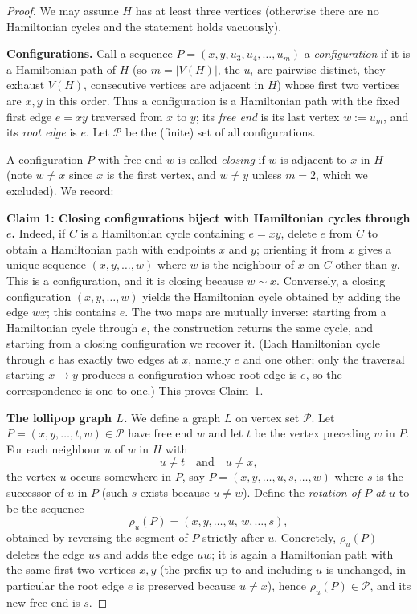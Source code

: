 \documentclass{amsart}
\theoremstyle{plain}
\theoremstyle{definition}
\begin{document}
\begin{proof}
We may assume $H$ has at least three vertices (otherwise there are no
Hamiltonian cycles and the statement holds vacuously).

\medskip
\noindent\textbf{Configurations.}
Call a sequence $P=(x,y,u_3,u_4,\dots,u_m)$ a \emph{configuration} if it is a
Hamiltonian path of $H$ (so $m=|V(H)|$, the $u_i$ are pairwise distinct, they
exhaust $V(H)$, consecutive vertices are adjacent in $H$) whose first two
vertices are $x,y$ in this order.  Thus a configuration is a Hamiltonian path
with the fixed first edge $e=xy$ traversed from $x$ to $y$; its \emph{free end}
is its last vertex $w:=u_m$, and its \emph{root edge} is $e$.  Let $\mathcal P$
be the (finite) set of all configurations.

A configuration $P$ with free end $w$ is called \emph{closing} if $w$ is adjacent
to $x$ in $H$ (note $w\neq x$ since $x$ is the first vertex, and $w\neq y$ unless
$m=2$, which we excluded).  We record:

\medskip
\noindent\textbf{Claim 1: Closing configurations biject with Hamiltonian cycles
through $e$.}
Indeed, if $C$ is a Hamiltonian cycle containing $e=xy$, delete $e$ from $C$ to
obtain a Hamiltonian path with endpoints $x$ and $y$; orienting it from $x$
gives a unique sequence $(x,y,\dots,w)$ where $w$ is the neighbour of $x$ on $C$
other than $y$.  This is a configuration, and it is closing because $w\sim x$.
Conversely, a closing configuration $(x,y,\dots,w)$ yields the Hamiltonian cycle
obtained by adding the edge $wx$; this contains $e$.  The two maps are mutually
inverse: starting from a Hamiltonian cycle through $e$, the construction returns
the same cycle, and starting from a closing configuration we recover it.  (Each
Hamiltonian cycle through $e$ has exactly two edges at $x$, namely $e$ and one
other; only the traversal starting $x\to y$ produces a configuration whose root
edge is $e$, so the correspondence is one-to-one.)  This proves Claim~1.

\medskip
\noindent\textbf{The lollipop graph $L$.}
We define a graph $L$ on vertex set $\mathcal P$.  Let $P=(x,y,\dots,t,w)\in
\mathcal P$ have free end $w$ and let $t$ be the vertex preceding $w$ in $P$.
For each neighbour $u$ of $w$ in $H$ with
\[
u\neq t \quad\text{and}\quad u\neq x,
\]
the vertex $u$ occurs somewhere in $P$, say $P=(x,y,\dots,u,s,\dots,w)$ where $s$
is the successor of $u$ in $P$ (such $s$ exists because $u\neq w$).  Define the
\emph{rotation of $P$ at $u$} to be the sequence
\[
\rho_u(P)=(x,y,\dots,u,\,w,\dots,s),
\]
obtained by reversing the segment of $P$ strictly after $u$.  Concretely,
$\rho_u(P)$ deletes the edge $us$ and adds the edge $uw$; it is again a
Hamiltonian path with the same first two vertices $x,y$ (the prefix up to and
including $u$ is unchanged, in particular the root edge $e$ is preserved because
$u\neq x$), hence $\rho_u(P)\in\mathcal P$, and its new free end is $s$.


\end{proof}
\end{document}
